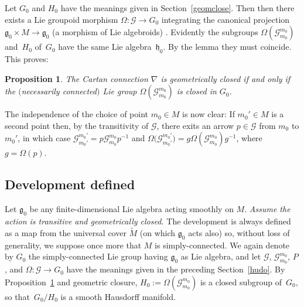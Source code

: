 \documentclass[11pt]{article}
\numberwithin{equation}{section}
\newtheorem{PropositionBlaom}[TheoremBlaom]{Proposition}
 { \theoremstyle{definition}
\newtheorem{CounterexampleBlaom}[TheoremBlaom]{Counterexample}
\newtheorem{RemarkBlaom}[TheoremBlaom]{Remark} }
\begin{document}
Let $G_0$ and $H_0$ have the meanings given in Section~\ref{geomclose}. Then
then there exists a Lie groupoid morphism $\Omega \colon {\mathcal G}
\rightarrow G_0$ integrating the canonical projection ${\mathfrak g}_0
\times M \rightarrow {\mathfrak g}_0$ (a morphism of Lie algebroids)
\cite[Lie~II]{Crainic_Fernandes_11}. Evidently the subgroups
$\Omega({\mathcal G}_{m_0}^{m_0})$ and~$H_0$ of~$G_0$ have the same
Lie algebra~${\mathfrak h}_0$. By the lemma they must coincide. This
proves:
\begin{PropositionBlaom}\label{Proposition4.2}
  The Cartan connection $\nabla$ is geometrically closed if and only
  if the $($necessarily connected$)$ Lie group $\Omega({\mathcal
    G}^{m_0}_{m_0})$ is closed in $G_0$.
\end{PropositionBlaom}

The independence of the choice of point $m_0 \in M$ is now clear: If
$m_0' \in M$ is a second point then, by the transitivity of ${\mathcal
  G} $, there exits an arrow $p \in {\mathcal G} $ from $m_0$ to
$m_0'$, in which case ${\mathcal G}^{m_0'}_{m_0'}=p {\mathcal
  G}^{m_0}_{m_0} p^{-1}$ and $\Omega\big({\mathcal G}^{m_0'}_{m_0'}\big)=g
\Omega({\mathcal G}^{m_0}_{m_0})g^{-1}$, where $g=\Omega(p)$.

\subsection{Development def\/ined}\label{devmap}
Let ${\mathfrak g}_0$ be any f\/inite-dimensional Lie algebra acting
smoothly on $M$.  {\em Assume the action is transitive and
  geometrically closed.}  The development is always def\/ined as a map
from the universal cover $\tilde M$ (on which ${\mathfrak g}_0$ acts
also) so, without loss of generality, we suppose once more that $M$ is
simply-connected. We again denote by $G_0$ the simply-connected Lie
group having ${\mathfrak g}_0 $ as Lie algebra, and let ${\mathcal
  G}$, ${\mathcal G}^{m_0}_{m_0}$, $P$, and $\Omega \colon {\mathcal
  G} \rightarrow G_0$ have the meanings given in the preceding
Section~\ref{hudo}. By Proposition~\ref{Proposition4.2} %
and geometric closure,
$H_0:=\Omega({\mathcal G}^{m_0}_{m_0})$ is a closed subgroup of~$G_0$,
so that~$G_0/H_0$ is a smooth Hausdorf\/f manifold.
\end{document}
